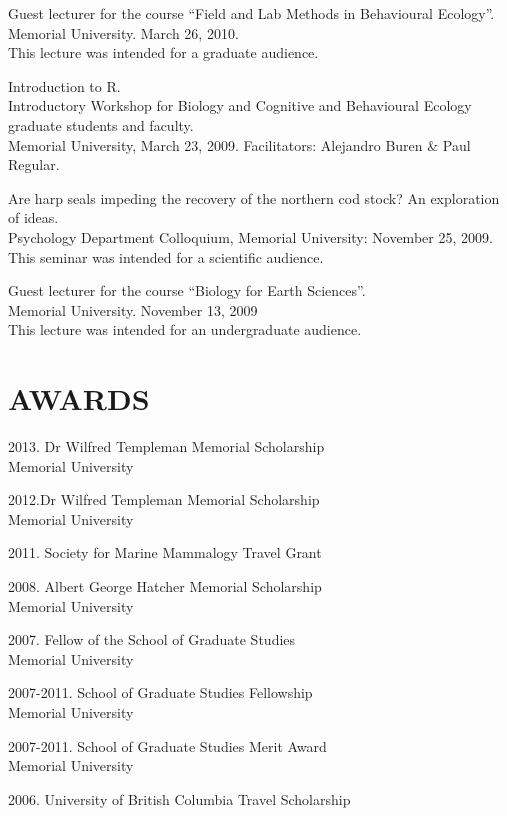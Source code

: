 \documentclass{res}
\begin{document}
\begin{resume}
Guest lecturer for the course “Field and Lab Methods in Behavioural Ecology”.\\ Memorial University. March 26, 2010. \\
This lecture was intended for a graduate audience.

Introduction to R.\\ Introductory Workshop for Biology and Cognitive and Behavioural Ecology graduate students and faculty. \\Memorial University, March 23, 2009. Facilitators: Alejandro Buren \& Paul Regular.


Are harp seals impeding the recovery of the northern cod stock? An exploration of ideas.\\
Psychology Department Colloquium, Memorial University: November 25, 2009. \\
This seminar was intended for a scientific audience.

Guest lecturer for the course “Biology for Earth Sciences”. \\Memorial University. November 13, 2009 \\
This lecture was intended for an undergraduate audience.
	
\newpage	
\section{AWARDS}
\vspace{0.1in} 
\begin{hangparas}{.4in}{1}
2013. Dr Wilfred Templeman Memorial Scholarship\\
Memorial University

2012.Dr Wilfred Templeman Memorial Scholarship\\
Memorial University

2011. Society for Marine Mammalogy Travel Grant

2008. Albert George Hatcher Memorial Scholarship\\
Memorial University

2007. Fellow of the School of Graduate Studies\\
Memorial University

2007-2011. 
School of Graduate Studies Fellowship \\
Memorial University

2007-2011. School of Graduate Studies Merit Award\\
Memorial University

2006. University of British Columbia Travel Scholarship


\end{hangparas}
\end{resume}
\end{document}
